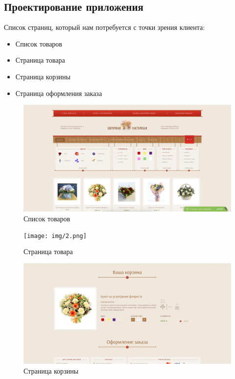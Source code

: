 \subsection{Проектирование приложения}

Список страниц, который нам потребуется с точки зрения клиента:

\begin{itemize}
	\item Список товаров
	\item Страница товара
	\item Страница корзины
	\item Страница оформления заказа
\end{itemize}

\begin{figure}[H]
	\centering
	\caption{Список товаров}
	\includegraphics[width=.9\textwidth]{img/1.png}
\end{figure}

\begin{figure}[H]
	\centering
	\caption{Страница товара}
	\texttt{[image: img/2.png]}
\end{figure}

\begin{figure}[H]
	\centering
	\caption{Страница корзины}
	\includegraphics[width=.9\textwidth]{img/3.png}
\end{figure}

